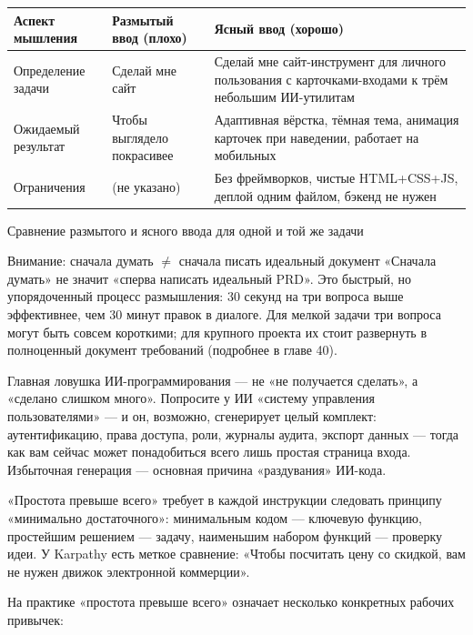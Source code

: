 \begin{center}
\begin{tabularx}{\linewidth}{|X|X|X|}
\hline
\textbf{Аспект мышления} & \textbf{Размытый ввод (плохо)} & \textbf{Ясный ввод (хорошо)} \tabularnewline
\hline
Определение задачи & Сделай мне сайт & Сделай мне сайт-инструмент для личного пользования с карточками-входами к трём небольшим ИИ-утилитам \tabularnewline
Ожидаемый результат & Чтобы выглядело покрасивее & Адаптивная вёрстка, тёмная тема, анимация карточек при наведении, работает на мобильных \tabularnewline
Ограничения & (не указано) & Без фреймворков, чистые HTML+CSS+JS, деплой одним файлом, бэкенд не нужен \tabularnewline
\hline
\end{tabularx}
\end{center}

\begin{center}\small\color{gray}Сравнение размытого и ясного ввода для одной и той же задачи\end{center}

\begin{tcbwarn}{Внимание: сначала думать $\neq$ сначала писать идеальный документ}
«Сначала думать» не значит «сперва написать идеальный PRD». Это быстрый, но упорядоченный процесс размышления: 30 секунд на три вопроса выше эффективнее, чем 30 минут правок в диалоге. Для мелкой задачи три вопроса могут быть совсем короткими; для крупного проекта их стоит развернуть в полноценный документ требований (подробнее в главе 40).

\end{tcbwarn}


Главная ловушка ИИ-программирования — не «не получается сделать», а «сделано слишком много». Попросите у ИИ «систему управления пользователями» — и он, возможно, сгенерирует целый комплект: аутентификацию, права доступа, роли, журналы аудита, экспорт данных — тогда как вам сейчас может понадобиться всего лишь простая страница входа. Избыточная генерация — основная причина «раздувания» ИИ-кода.

«Простота превыше всего» требует в каждой инструкции следовать принципу «минимально достаточного»: минимальным кодом — ключевую функцию, простейшим решением — задачу, наименьшим набором функций — проверку идеи. У Karpathy есть меткое сравнение: «Чтобы посчитать цену со скидкой, вам не нужен движок электронной коммерции».

На практике «простота превыше всего» означает несколько конкретных рабочих привычек:

